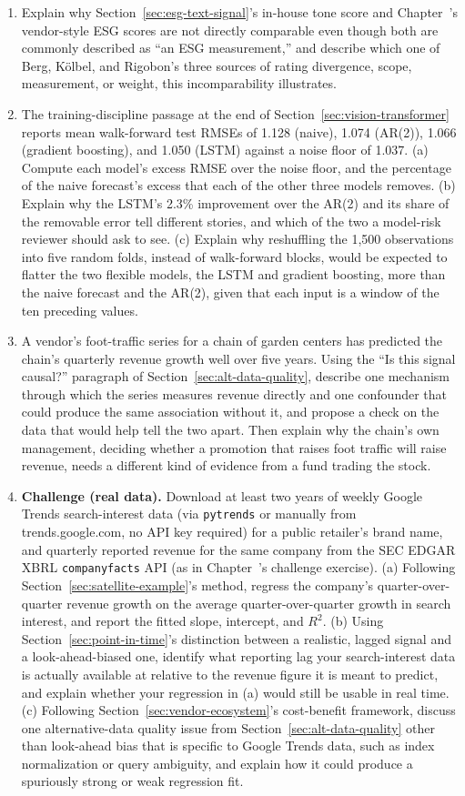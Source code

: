 \documentclass[../ai_in_finance]{subfiles}
\begin{document}
\begin{enumerate}[exercises]
    \item Explain why Section~\ref{sec:esg-text-signal}'s in-house tone score and Chapter~'s vendor-style ESG scores are not directly comparable even though both are commonly described as ``an ESG measurement,'' and describe which one of Berg, Kölbel, and Rigobon's three sources of rating divergence, scope, measurement, or weight, this incomparability illustrates.
    \item The training-discipline passage at the end of Section~\ref{sec:vision-transformer} reports mean walk-forward test RMSEs of 1.128 (naive), 1.074 (AR(2)), 1.066 (gradient boosting), and 1.050 (LSTM) against a noise floor of 1.037. (a) Compute each model's excess RMSE over the noise floor, and the percentage of the naive forecast's excess that each of the other three models removes. (b) Explain why the LSTM's 2.3\% improvement over the AR(2) and its share of the removable error tell different stories, and which of the two a model-risk reviewer should ask to see. (c) Explain why reshuffling the 1,500 observations into five random folds, instead of walk-forward blocks, would be expected to flatter the two flexible models, the LSTM and gradient boosting, more than the naive forecast and the AR(2), given that each input is a window of the ten preceding values.
    \item A vendor's foot-traffic series for a chain of garden centers has predicted the chain's quarterly revenue growth well over five years. Using the ``Is this signal causal?'' paragraph of Section~\ref{sec:alt-data-quality}, describe one mechanism through which the series measures revenue directly and one confounder that could produce the same association without it, and propose a check on the data that would help tell the two apart. Then explain why the chain's own management, deciding whether a promotion that raises foot traffic will raise revenue, needs a different kind of evidence from a fund trading the stock.
    \item \textbf{Challenge (real data).} Download at least two years of weekly Google Trends search-interest data (via \texttt{pytrends} or manually from trends.google.com, no API key required) for a public retailer's brand name, and quarterly reported revenue for the same company from the SEC EDGAR XBRL \texttt{companyfacts} API (as in Chapter~'s challenge exercise). (a) Following Section~\ref{sec:satellite-example}'s method, regress the company's quarter-over-quarter revenue growth on the average quarter-over-quarter growth in search interest, and report the fitted slope, intercept, and $R^2$. (b) Using Section~\ref{sec:point-in-time}'s distinction between a realistic, lagged signal and a look-ahead-biased one, identify what reporting lag your search-interest data is actually available at relative to the revenue figure it is meant to predict, and explain whether your regression in (a) would still be usable in real time. (c) Following Section~\ref{sec:vendor-ecosystem}'s cost-benefit framework, discuss one alternative-data quality issue from Section~\ref{sec:alt-data-quality} other than look-ahead bias that is specific to Google Trends data, such as index normalization or query ambiguity, and explain how it could produce a spuriously strong or weak regression fit.

\end{enumerate}
\end{document}
